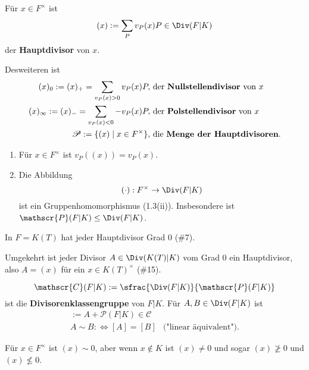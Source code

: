 \begin{definition}
    Für $x \in F^{\times}$ ist
    $$ (x) := \sum\limits_P v_P(x) P \in \Div(F|K)$$
    der \textbf{Hauptdivisor} von $x$.

    Desweiteren ist
    \begin{align*}
        (x)_0 := (x)_+ = \sum\limits_{v_P(x) > 0} v_P(x) P, & \text{ der \textbf{Nullstellendivisor} von } x\\
        (x)_\infty := (x)_- = \sum\limits_{v_P(x) < 0} -v_P(x) P, & \text{ der \textbf{Polstellendivisor} von } x\\
        \mathscr{P} := \{(x) \mid x \in F^\times \}, & \text{ die \textbf{Menge der Hauptdivisoren}.}
    \end{align*}
\end{definition}

\begin{bemerkungnr}
    \begin{enumerate}
        \item Für $x \in F^{\times}$ ist $v_P((x)) = v_P(x)$.
        \item Die Abbildung
        $$ (\cdot): F^{\times} \to \Div(F|K)$$
        ist ein Gruppenhomomorphismus (1.3(ii)). 
        Insbesondere ist $\mathscr{P}(F|K) \leq \Div(F|K)$.
    \end{enumerate}
\end{bemerkungnr}

\begin{beispiel}
    In $F=K(T)$ hat jeder Hauptdivisor Grad $0$ (\#7).

    Umgekehrt ist jeder Divisor $A \in \Div(K(T)|K)$ vom Grad $0$ ein Hauptdivisor, also
    $A = (x)$ für ein $x \in K(T)^{\times}$ (\#15).
\end{beispiel}

\begin{definition}
    $$ \mathscr{C}(F|K) := \sfrac{\Div(F|K)}{\mathscr{P}(F|K)}$$
    ist die \textbf{Divisorenklassengruppe} von $F|K$.
    Für $A,B \in \Div(F|K)$ ist
    \begin{align*}
        [A] := A + \mathscr{P}(F|K) \in \mathscr{C}\\
        A \sim B : \iff [A] = [B] & \text{("linear äquivalent")}.
    \end{align*}
\end{definition}

\begin{beispiel}
    Für $x \in F^{\times}$ ist $(x) \sim 0$, aber wenn $x \notin K$ ist $(x) \ne 0$ und sogar $(x) \not \geq 0$ und $(x) \not \leq 0$.
\end{beispiel}

